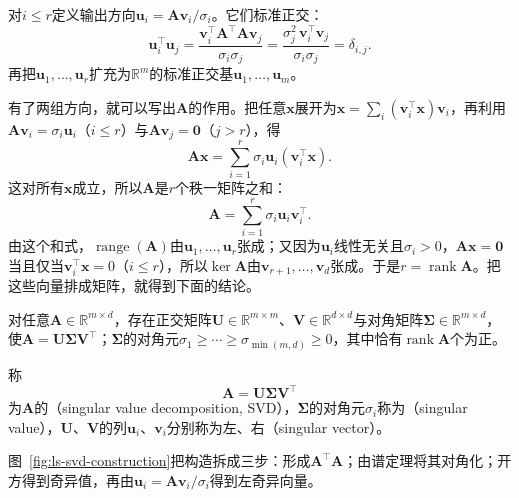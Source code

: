 对$i\leq r$定义输出方向$\bm u_i=\bm A\bm v_i/\sigma_i$。它们标准正交：
\[
 \bm u_i^\top\bm u_j
 =\frac{\bm v_i^\top\bm A^\top\bm A\bm v_j}{\sigma_i\sigma_j}
 =\frac{\sigma_j^2\,\bm v_i^\top\bm v_j}{\sigma_i\sigma_j}=\delta_{i,j}.
\]
再把$\bm u_1,\dots,\bm u_r$扩充为$\mathbb R^m$的标准正交基$\bm u_1,\ldots,\bm u_m$。

有了两组方向，就可以写出$\bm A$的作用。把任意$\bm x$展开为$\bm x=\sum_i(\bm v_i^\top\bm x)\bm v_i$，再利用$\bm A\bm v_i=\sigma_i\bm u_i$（$i\leq r$）与$\bm A\bm v_j=\bm0$（$j>r$），得
\[
 \bm A\bm x=\sum_{i=1}^r\sigma_i\bm u_i(\bm v_i^\top\bm x).
\]
这对所有$\bm x$成立，所以$\bm A$是$r$个秩一矩阵之和：
\begin{equation}
 \bm A=\sum_{i=1}^r\sigma_i\bm u_i\bm v_i^\top.
 \label{eq:matrix-analysis-svd-rank-one-sum}
\end{equation}
由这个和式，$\operatorname{range}(\bm A)$由$\bm u_1,\ldots,\bm u_r$张成；又因为$\bm u_i$线性无关且$\sigma_i>0$，$\bm A\bm x=\bm0$当且仅当$\bm v_i^\top\bm x=0$（$i\leq r$），所以$\ker\bm A$由$\bm v_{r+1},\ldots,\bm v_d$张成。于是$r=\operatorname{rank}\bm A$。把这些向量排成矩阵，就得到下面的结论。

\begin{theorem}[SVD的存在]
\label{thm:ls-svd-existence}
对任意$\bm A\in\mathbb R^{m\times d}$，存在正交矩阵$\bm U\in\mathbb R^{m\times m}$、$\bm V\in\mathbb R^{d\times d}$与对角矩阵$\bm\Sigma\in\mathbb R^{m\times d}$，使$\bm A=\bm U\bm\Sigma\bm V^\top$；$\bm\Sigma$的对角元$\sigma_1\geq\cdots\geq\sigma_{\min(m,d)}\geq0$，其中恰有$\operatorname{rank}\bm A$个为正。
\end{theorem}

\begin{definition}[奇异值分解]
\label{def:matrix-analysis-svd}
称
\begin{equation}
 \bm A=\bm U\bm\Sigma\bm V^\top
 \label{eq:matrix-analysis-svd}
\end{equation}
为$\bm A$的（singular value decomposition, SVD），$\bm\Sigma$的对角元$\sigma_i$称为（singular value），$\bm U$、$\bm V$的列$\bm u_i$、$\bm v_i$分别称为左、右（singular vector）。
\end{definition}

图~\ref{fig:ls-svd-construction}把构造拆成三步：形成$\bm A^\top\bm A$；由谱定理将其对角化；开方得到奇异值，再由$\bm u_i=\bm A\bm v_i/\sigma_i$得到左奇异向量。

